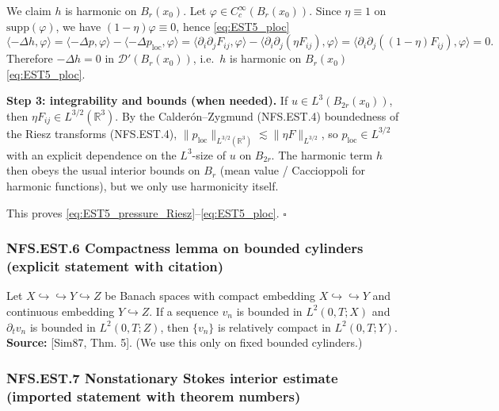 \documentclass[
  11pt,
]{article}
\begin{document}
We claim \(h\) is harmonic on \(B_r(x_0)\). Let \(\varphi\in C_c^\infty(B_r(x_0))\). Since \(\eta\equiv 1\) on \(\mathrm{supp}(\varphi)\), we have \((1-\eta)\varphi\equiv 0\), hence \eqref{eq:EST5_ploc} \[
\langle -\Delta h,\varphi\rangle
= \langle -\Delta p,\varphi\rangle - \langle -\Delta p_{\mathrm{loc}},\varphi\rangle
= \langle \partial_i\partial_jF_{ij},\varphi\rangle - \langle \partial_i\partial_j(\eta F_{ij}),\varphi\rangle
= \langle \partial_i\partial_j((1-\eta)F_{ij}),\varphi\rangle = 0.
\] Therefore \(-\Delta h=0\) in \(\mathcal D'(B_r(x_0))\), i.e.~\(h\) is harmonic on \(B_r(x_0)\) \eqref{eq:EST5_ploc}.

\textbf{Step 3: integrability and bounds (when needed).} If \(u\in L^3(B_{2r}(x_0))\), then \(\eta F_{ij}\in L^{3/2}(\mathbb R^3)\). By the Calderón--Zygmund (NFS.EST.4) boundedness of the Riesz transforms (NFS.EST.4), \(\|p_{\mathrm{loc}}\|_{L^{3/2}(\mathbb R^3)}\lesssim \|\eta F\|_{L^{3/2}}\), so \(p_{\mathrm{loc}}\in L^{3/2}\) with an explicit dependence on the \(L^3\)-size of \(u\) on \(B_{2r}\). The harmonic term \(h\) then obeys the usual interior bounds on \(B_r\) (mean value / Caccioppoli for harmonic functions), but we only use harmonicity itself.

This proves \eqref{eq:EST5_pressure_Riesz}--\eqref{eq:EST5_ploc}. \(\square\)

\hypertarget{nfs.est.6-compactness-lemma-on-bounded-cylinders-explicit-statement-with-citation}{%
\subsubsection{NFS.EST.6 Compactness lemma on bounded cylinders (explicit statement with citation)}\label{nfs.est.6-compactness-lemma-on-bounded-cylinders-explicit-statement-with-citation}}

Let \(X\hookrightarrow\hookrightarrow Y\hookrightarrow Z\) be Banach spaces with compact embedding \(X\hookrightarrow\hookrightarrow Y\) and continuous embedding \(Y\hookrightarrow Z\). If a sequence \(v_n\) is bounded in \(L^2(0,T;X)\) and \(\partial_t v_n\) is bounded in \(L^2(0,T;Z)\), then \(\{v_n\}\) is relatively compact in \(L^2(0,T;Y)\). \textbf{Source:} {[}Sim87, Thm. 5{]}. (We use this only on fixed bounded cylinders.)

\hypertarget{nfs.est.7-nonstationary-stokes-interior-estimate-imported-statement-with-theorem-numbers}{%
\subsubsection{NFS.EST.7 Nonstationary Stokes interior estimate (imported statement with theorem numbers)}\label{nfs.est.7-nonstationary-stokes-interior-estimate-imported-statement-with-theorem-numbers}}
\end{document}
